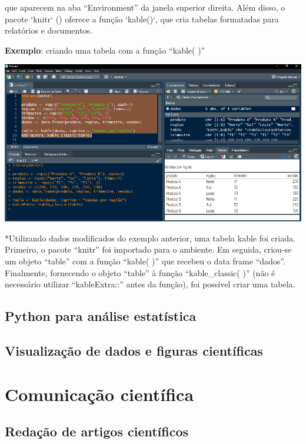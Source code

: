 \documentclass[
]{book}
\begin{document}
que aparecem na aba ``Environment'' da janela superior direita. Além disso, o pacote `knitr` (\citeproc{ref-xieaut2024}{Xie {[}aut et al. 2024}) oferece a função `kable()`, que cria tabelas formatadas para relatórios e documentos.

\textbf{Exemplo}: criando uma tabela com a função ``kable( )''

\includegraphics{images/clipboard-2208731083.png}

*Utilizando dados modificados do exemplo anterior, uma tabela kable foi criada. Primeiro, o pacote ``knitr'' foi importado para o ambiente. Em seguida, criou-se um objeto ``table'' com a função ``kable( )'' que recebeu o data frame ``dados''. Finalmente, fornecendo o objeto ``table'' à função ``kable\_classic( )'' (não é necessário utilizar ``kableExtra::'' antes da função), foi possível criar uma tabela.

\section{Python para análise estatística}\label{python-para-anuxe1lise-estatuxedstica}

\section{Visualização de dados e figuras científicas}\label{visualizauxe7uxe3o-de-dados-e-figuras-cientuxedficas}

\chapter{Comunicação científica}\label{comunicauxe7uxe3o-cientuxedfica}

\section{Redação de artigos científicos}\label{redauxe7uxe3o-de-artigos-cientuxedficos}
\end{document}
